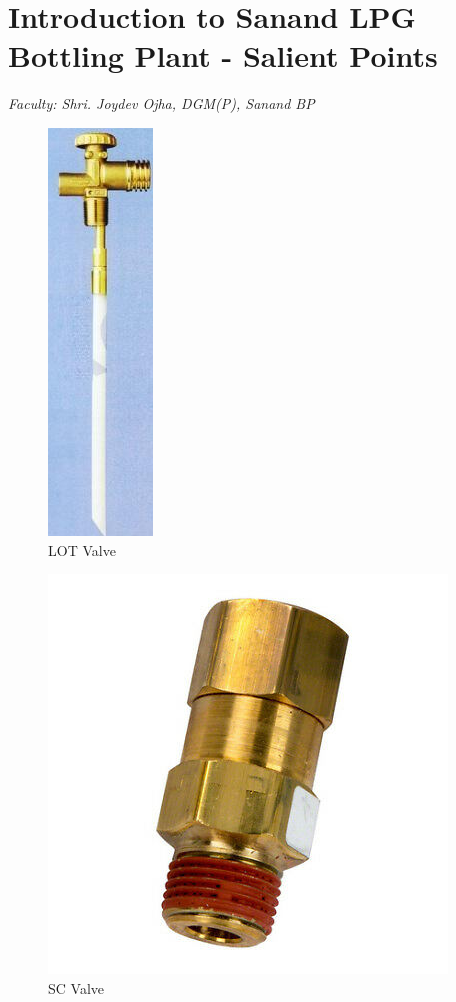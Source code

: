 \documentclass{report}
\begin{document}
	\section{Introduction to Sanand LPG Bottling Plant - Salient Points}
	\textit{Faculty: Shri. Joydev Ojha, DGM(P), Sanand BP}
	\begin{figure}
		\centering
		\includegraphics{lot_valve}
		\caption{LOT Valve}
		\label{lot_valve}
	\end{figure}
	\begin{figure}
		\centering
		\includegraphics{sc_valve}
		\caption{SC Valve}
		\label{sc_valve}
	\end{figure}
\end{document}
